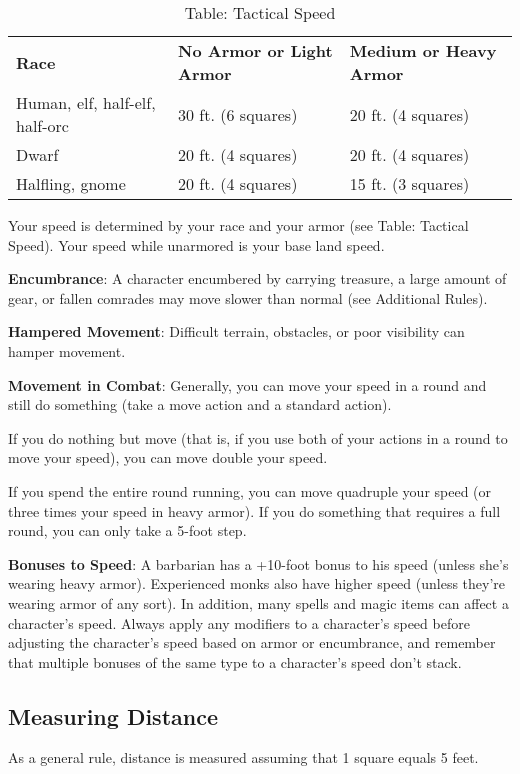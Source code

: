 \begin{table*}[]
\sffamily
\caption{Table: Tactical Speed}
\begin{tabular}{lll}
\textbf{Race} & \textbf{No Armor or Light Armor} & \textbf{Medium or Heavy Armor}\\
Human, elf, half-elf, half-orc & 30 ft. (6 squares) & 20 ft. (4 squares) \\
 Dwarf & 20 ft. (4 squares) & 20 ft. (4 squares) \\
 Halfling, gnome & 20 ft. (4 squares) & 15 ft. (3 squares)\\
\end{tabular}
\end{table*}			
Your speed is determined by your race and your armor (see Table: Tactical Speed). Your speed while unarmored is your base land speed.
				
\textbf{Encumbrance}: A character encumbered by carrying treasure, a large amount of gear, or fallen comrades may move slower than normal (see Additional Rules).
				
\textbf{Hampered Movement}: Difficult terrain, obstacles, or poor visibility can hamper movement.
				
\textbf{Movement in Combat}: Generally, you can move your speed in a round and still do something (take a move action and a standard action).
				
If you do nothing but move (that is, if you use both of your actions in a round to move your speed), you can move double your speed.
				
If you spend the entire round running, you can move quadruple your speed (or three times your speed in heavy armor). If you do something that requires a full round, you can only take a 5-foot step.
				
\textbf{Bonuses to Speed}: A barbarian has a +10-foot bonus to his speed (unless she's wearing heavy armor). Experienced monks also have higher speed (unless they're wearing armor of any sort). In addition, many spells and magic items can affect a character's speed. Always apply any modifiers to a character's speed before adjusting the character's speed based on armor or encumbrance, and remember that multiple bonuses of the same type to a character's speed don't stack.
				
\subsection{Measuring Distance}

				
As a general rule, distance is measured assuming that 1 square equals 5 feet.
				
